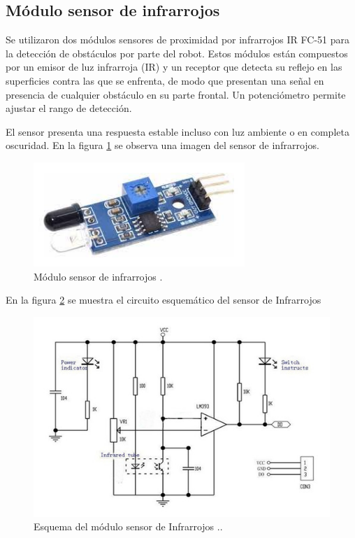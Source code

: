 \subsection{Módulo sensor de infrarrojos}

Se utilizaron dos módulos sensores de proximidad por infrarrojos IR FC-51 \citep{IR} para la detección de obstáculos por parte del robot. Estos módulos están compuestos por  un emisor de luz infrarroja (IR)  y un receptor que detecta su reflejo en  las superficies contra las que se enfrenta, de modo que presentan una señal en  presencia de cualquier obstáculo en su parte frontal. Un potenciómetro permite ajustar el rango de detección. 

El sensor presenta una respuesta estable incluso con luz ambiente o en completa oscuridad. En la figura \ref{fig:moduloIR} se observa una imagen del sensor de infrarrojos.

\begin{figure}[h]
	\centering
	\includegraphics[width=8cm]{./Figures/moduloIR.jpg}
	\caption{Módulo sensor de infrarrojos \protect\footnotemark.}
	\label{fig:moduloIR}
\end{figure}



En la figura \ref{fig:IRschem} se muestra el circuito esquemático  del sensor de Infrarrojos

\begin{figure}[h]
	\centering
	\includegraphics[width=14cm]{./Figures/IRschem.jpg}
	\caption{Esquema del módulo sensor de Infrarrojos .\protect\footnotemark.}
	\label{fig:IRschem}
\end{figure}
\pagebreak


